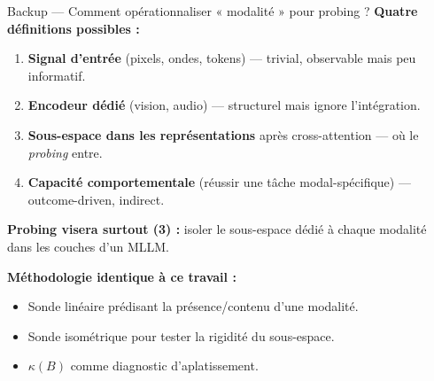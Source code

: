 \documentclass[aspectratio=169,11pt]{beamer}
\begin{document}
\begin{frame}{Backup --- Comment opérationnaliser « modalité » pour probing ?}
  \textbf{Quatre définitions possibles :}
  \begin{enumerate}\setlength\itemsep{4pt}
    \item \textbf{Signal d'entrée} (pixels, ondes, tokens) --- trivial,
          observable mais peu informatif.
    \item \textbf{Encodeur dédié} (vision, audio) --- structurel mais
          ignore l'intégration.
    \item \alert{\textbf{Sous-espace dans les représentations}} après
          cross-attention --- où le \emph{probing} entre.
    \item \textbf{Capacité comportementale} (réussir une tâche
          modal-spécifique) --- outcome-driven, indirect.
  \end{enumerate}

  \vspace{0.3cm}
  \textbf{Probing visera surtout (3) :} isoler le sous-espace dédié
  à chaque modalité dans les couches d'un MLLM.

  \vspace{0.3cm}
  \textbf{Méthodologie identique à ce travail :}
  \begin{itemize}\setlength\itemsep{2pt}
    \item Sonde linéaire prédisant la présence/contenu d'une modalité.
    \item Sonde isométrique pour tester la rigidité du sous-espace.
    \item $\kappa(B)$ comme diagnostic d'aplatissement.
  \end{itemize}
\end{frame}
\end{document}
